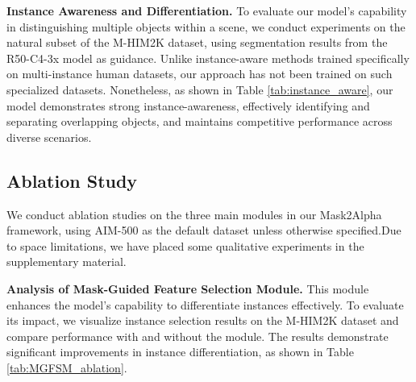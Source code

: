 \noindent
{\bf Instance Awareness and Differentiation.} To evaluate our model's capability in distinguishing multiple objects within a scene, we conduct experiments on the natural subset of the M-HIM2K\cite{huynh2024maggie} dataset, using segmentation results from the R50-C4-3x\cite{cheng2022mask2former} model as guidance. Unlike instance-aware methods trained specifically on multi-instance human datasets, our approach has not been trained on such specialized datasets. Nonetheless, as shown in Table \ref{tab:instance_aware}, 
our model demonstrates strong instance-awareness, effectively identifying and separating overlapping objects, and maintains competitive performance across diverse scenarios.

\noindent

\subsection{Ablation Study}
\label{sec:ablat}
We conduct ablation studies on the three main modules in our Mask2Alpha framework, using AIM-500 as the default dataset unless otherwise specified.Due to space limitations, we have placed some qualitative experiments in the supplementary material.

\noindent
{\bf Analysis of Mask-Guided Feature Selection Module.} This module enhances the model’s capability to differentiate instances effectively. To evaluate its impact, we visualize instance selection results on the M-HIM2K dataset and compare performance with and without the module. The results demonstrate significant improvements in instance differentiation, as shown in Table \ref{tab:MGFSM_ablation}.

\begin{table}[t]
    \centering
    \vspace{-0.1in}
    \caption{Ablation results of Mask-Guided Feature Selection Module.}
    \label{tab:MGFSM_ablation}
    \vspace{-0.1in}
\end{table}


